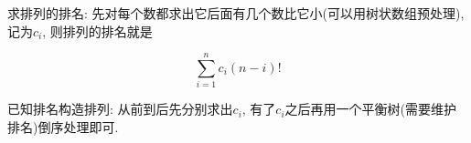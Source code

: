求排列的排名: 先对每个数都求出它后面有几个数比它小(可以用树状数组预处理), 记为$c_i$, 则排列的排名就是

$$ \sum_{i = 1} ^ n c_i (n - i)! $$

已知排名构造排列: 从前到后先分别求出$c_i$, 有了$c_i$之后再用一个平衡树(需要维护排名)倒序处理即可.